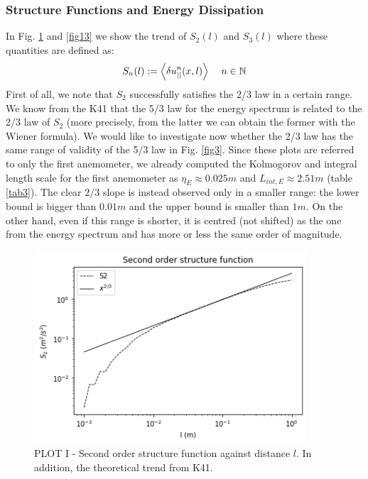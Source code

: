 \documentclass[11pt,titlepage]{article}
\begin{document}
\subsubsection{Structure Functions and Energy Dissipation}\label{structure_functions}
In Fig. \ref{fig12} and  \ref{fig13} we show the trend of $S_2(l)$ and $S_3(l)$ where these quantities are defined as:
\begin{equation*}
	S_n(l):= \left< \delta u_{||}^n(x,l) \right> \hspace{4mm} n \in \mathbb{N}
\end{equation*}
First of all, we note that $S_2$ successfully satisfies the 2/3 law in a certain range. We know from the K41 that the 5/3 law for the energy spectrum is related to the 2/3 law of $S_2$ (more precisely, from the latter we can obtain the former with the Wiener formula). We would like to investigate now whether the 2/3 law has the same range of validity of the 5/3 law in Fig. \ref{fig3}. Since these plots are referred to only the first anemometer, we already computed the Kolmogorov and integral length scale for the first anemometer as $\eta_E \approx 0.025m$ and $L_{int,E} \approx 2.51m$ (table \ref{tab3}). The clear $2/3$ slope is instead observed only in a smaller range: the lower bound is bigger than $0.01m$ and the upper bound is smaller than $1m$. On the other hand, even if this range is shorter, it is centred (not shifted) as the one from the energy spectrum and has more or less the same order of magnitude. 
\begin{center}
	\begin{figure} [h]
		\centering
		\includegraphics[width = 4in]{./figures/ex1_7_1.png}
		\caption{PLOT I - Second order structure function against distance $l$. In addition, the theoretical trend from K41.}
		\label{fig12}
	\end{figure}
\end{center}
\end{document}
